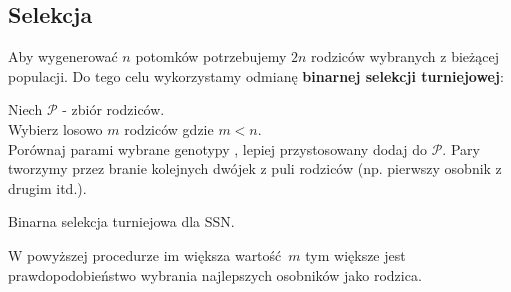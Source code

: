 \documentclass{article}
\begin{document}
\subsection{Selekcja}
Aby wygenerować $n$ potomków potrzebujemy $2n$ rodziców wybranych z bieżącej populacji.
Do tego celu wykorzystamy odmianę \textbf{binarnej selekcji turniejowej}:\\
\begin{algorithm}[H]
 Niech $\mathcal{P}$ - zbiór rodziców.\\
 Wybierz losowo $m$ rodziców gdzie $m < n$.\\
  {
	Porównaj parami wybrane genotypy , lepiej przystosowany dodaj do $\mathcal{P}$.
	Pary tworzymy przez branie kolejnych dwójek z puli rodziców (np. pierwszy osobnik z 
	drugim itd.).
 }
 \caption{Binarna selekcja turniejowa dla SSN.}
\end{algorithm}
W powyższej procedurze im większa wartość $m$ tym większe jest prawdopodobieństwo wybrania
najlepszych osobników jako rodzica.
\end{document}
